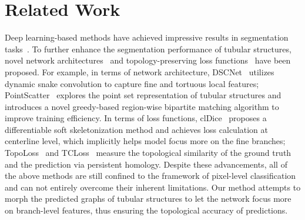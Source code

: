 \section{Related Work}
Deep learning-based methods have achieved impressive results in segmentation tasks~\cite{long2015fully, ronneberger2015u, chen2018encoder}. To further enhance the segmentation performance of tubular structures, novel network architectures~\cite{jin2019dunet, lou2021dc, shin2019deep, wang2020deep, mei2021coanet, yang2023directional, wang2022pointscatter, qi2023dynamic} and topology-preserving loss functions~\cite{hu2019topology, mosinska2018beyond, shit2021cldice, menten2023skeletonization, qi2023dynamic} have been proposed. For example, in terms of network architecture, DSCNet~\cite{qi2023dynamic} utilizes dynamic snake convolution to capture fine and tortuous local features; PointScatter~\cite{wang2022pointscatter} explores the point set representation of tubular structures and introduces a novel greedy-based region-wise bipartite matching algorithm to improve training efficiency. In terms of loss functions, clDice~\cite{shit2021cldice} proposes a differentiable soft skeletonization method and achieves loss calculation at centerline level, which implicitly helps model focus more on the fine branches; TopoLoss~\cite{hu2019topology} and TCLoss~\cite{qi2023dynamic} measure the topological similarity of the ground truth and the prediction via persistent homology. Despite these advancements, all of the above methods are still confined to the framework of pixel-level classification and can not entirely overcome their inherent limitations. Our method attempts to morph the predicted graphs of tubular structures to let the network focus more on branch-level features, thus ensuring the topological accuracy of predictions.


